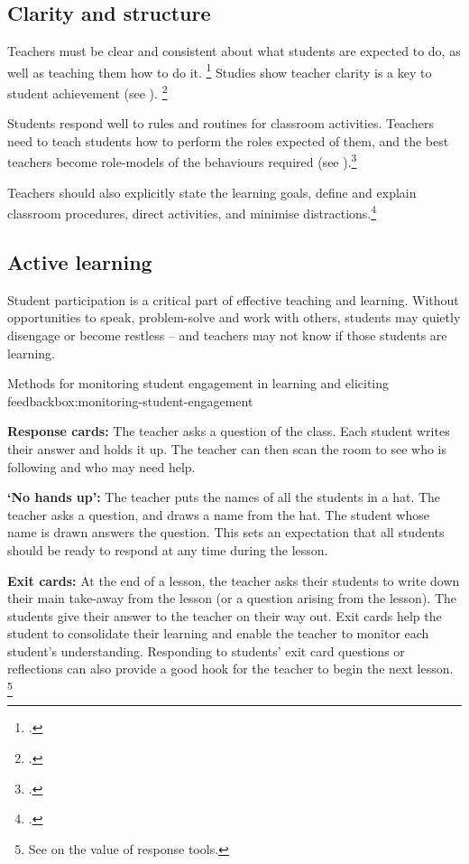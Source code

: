 \documentclass{grattan}
\begin{document}
\subsection{Clarity and structure}\label{subsec:clarity-and-structure}
Teachers must be clear and consistent about what students are expected to do, as well as teaching them how to do it.%
    \footcites{Marzano2003ClassroomManagementWorks}{Simonsen2008EvidenceBasedPractices}
Studies show teacher clarity is a key to student achievement (see ).%
    \footcite{Hattie2008visiblelearningsynthesis}

Students respond well to rules and routines for classroom activities. Teachers need to teach students how to perform the roles expected of them, and the best teachers become role-models of the behaviours required (see ).\footcite{Brophy2006HistoryResearchClassroom}

Teachers should also explicitly state the learning goals, define and explain classroom procedures, direct activities, and minimise distractions.\footcites{Greenberg2014TrainingOurFuture}{Marzano2003ClassroomManagementWorks}{Simonsen2008EvidenceBasedPractices}

\subsection{Active learning}\label{subsec:active-learning}
Student participation is a critical part of effective teaching and learning. Without opportunities to speak, problem-solve and work with others, students may quietly disengage or become restless -- and teachers may not know if those students are learning.

\begin{verysmallbox}[!t]{Methods for monitoring student engagement in learning and eliciting feedback}{box:monitoring-student-engagement}

\textbf{Response cards:} The teacher asks a question of the class. Each student writes their answer and holds it up. The teacher can then scan the room to see who is following and who may need help.

\textbf{`No hands up':} The teacher puts the names of all the students in a hat. The teacher asks a question, and draws a name from the hat. The student whose name is drawn answers the question. This sets an expectation that all students should be ready to respond at any time during the lesson.

\textbf{Exit cards:} At the end of a lesson, the teacher asks their students to write down their main take-away from the lesson (or a question arising from the lesson). The students give their answer to the teacher on their way out. Exit cards help the student to consolidate their learning and enable the teacher to monitor each student's understanding. Responding to students' exit card questions or reflections can also provide a good hook for the teacher to begin the next lesson.%
\footnote{See \textcite{Simonsen2008EvidenceBasedPractices} on the value of response tools.}

\end{verysmallbox}
\end{document}
